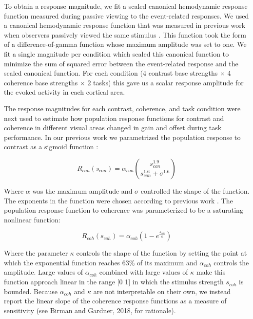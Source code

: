 To obtain a response magnitude, we fit a scaled canonical hemodynamic response function measured during passive viewing to the event-related responses. We used a canonical hemodynamic response function that was measured in previous work when observers passively viewed the same stimulus \citep{Birman2018-sp}. This function took the form of a difference-of-gamma function whose maximum amplitude was set to one. We fit a single magnitude per condition which scaled this canonical function to minimize the sum of squared error between the event-related response and the scaled canonical function. For each condition (4 contrast base strengths $\times$ 4 coherence base strengths $\times$ 2 tasks) this gave us a scalar response amplitude for the evoked activity in each cortical area. 

The response magnitudes for each contrast, coherence, and task condition were next used to estimate how population response functions for contrast and coherence in different visual areas changed in gain and offset during task performance. In our previous work we parametrized the population response to contrast as a sigmoid function \citep{Albrecht1982-rq,Naka1966-fh}:

\begin{equation}
    R_{con}(s_{con}) = \alpha_{con}(\frac{s_{con}^{1.9}}{s_{con}^{1.6}+\sigma^{1.6}})
    \label{eqn:c4conresp}
\end{equation}

Where $\alpha$ was the maximum amplitude and $\sigma$ controlled the shape of the function. The exponents in the function were chosen according to previous work \citep{Boynton1999-jd}. The population response function to coherence was parameterized to be a saturating nonlinear function:

\begin{equation}
    R_{coh}(s_{coh})=\alpha_{coh}(1 - e^{\frac{s_{coh}}{\kappa}})
    \label{eqn:c4cohresp}
\end{equation}

Where the parameter $\kappa$ controls the shape of the function by setting the point at which the exponential function reaches 63\% of its maximum and $\alpha_{coh}$  controls the amplitude. Large values of $\alpha_{coh}$ combined with large values of $\kappa$ make this function approach linear in the range [0 1] in which the stimulus strength $s_{coh}$ is bounded. Because $\alpha_{coh}$ and $\kappa$ are not interpretable on their own, we instead report the linear slope of the coherence response functions as a measure of sensitivity (see Birman and Gardner, 2018, for rationale). 

